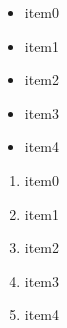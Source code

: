 \begin{itemize}
\item item0
\item item1
\item item2
\item item3
\item item4
\end{itemize}

\begin{enumerate}
\item item0
\item item1
\item item2
\item item3
\item item4
\end{enumerate}
